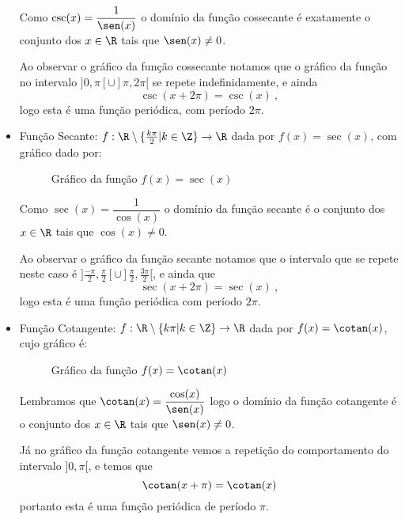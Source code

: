 \begin{itemize}
  Como $\csc(x)= \dfrac{1}{\sen(x)}$ o domínio da função cossecante é exatamente o conjunto dos $x \in \R$ tais que $\sen(x) \neq 0$.

  Ao observar o gráfico da função cossecante notamos que o gráfico da função no intervalo $]0, \pi[ \cup ] \pi, 2 \pi[$ se repete indefinidamente, e ainda
\begin{equation}
\csc(x + 2\pi)= \csc(x) \ , 
\end{equation}
  logo esta é uma função periódica, com período $2\pi$.

  \item Função Secante: $f: \R \setminus \{\frac{k\pi}{2} | k \in \Z\} \rightarrow \R$ dada por $f(x)= \sec(x)$, com gráfico dado por:

  \begin{figure}[H]
  \centering
    \caption{Gráfico da função $f(x)= \sec(x)$}
  \end{figure}

  Como $\sec(x)= \dfrac{1}{\cos (x)}$ o domínio da função secante é o conjunto dos $x \in \R$ tais que $\cos(x) \neq 0$.

  Ao observar o gráfico da função secante notamos que o intervalo que se repete neste caso é $]\frac{-\pi}{2}, \frac{\pi}{2}[ \cup ] \frac{\pi}{2}, \frac{3\pi}{2}[$, e ainda que
\begin{equation}
\sec(x + 2\pi)= \sec(x) \ ,
\end{equation}
  logo esta é uma função periódica com período $2\pi$.

  \item Função Cotangente: $f: \R \setminus \{ k\pi | k \in \Z\} \rightarrow \R$ dada por $f(x)= \cotan(x)$, cujo gráfico é:

  \begin{figure}[H]
  \centering
    \caption{Gráfico da função $f(x)= \cotan(x)$}
  \end{figure}

  Lembramos que $\cotan(x)= \dfrac{\cos(x)}{\sen(x)}$ logo o domínio da função cotangente é o conjunto dos $x \in \R$ tais que $\sen(x) \neq 0$.

  Já no gráfico da função cotangente vemos a repetição do comportamento do intervalo $]0, \pi[$, e temos que
\begin{equation}
\cotan(x + \pi)= \cotan(x)
\end{equation}
  portanto esta é uma função periódica de período $\pi$.


\end{itemize}
